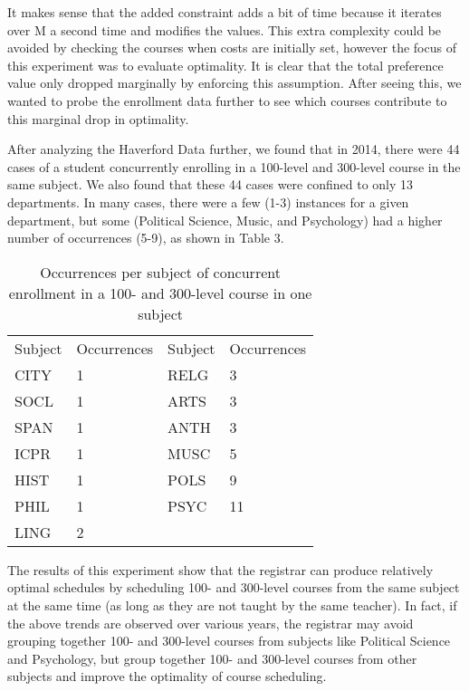 \documentclass[11pt, oneside]{article}   	%
\begin{document}
\begin{enumerate}
It makes sense that the added constraint adds a bit of time because it iterates over M a second time and modifies the values. This extra complexity could be avoided by checking the courses when costs are initially set, however the focus of this experiment was to evaluate optimality. It is clear that the total preference value only dropped marginally by enforcing this assumption. After seeing this, we wanted to probe the enrollment data further to see which courses contribute to this marginal drop in optimality.

After analyzing the Haverford Data further, we found that in 2014, there were 44 cases of a student concurrently enrolling in a 100-level and 300-level course in the same subject. We also found that these 44 cases were confined to only 13 departments. In many cases, there were a few (1-3) instances for a given department, but some (Political Science, Music, and Psychology) had a higher number of occurrences (5-9), as shown in Table 3.\\

\begin{table}[h]
\centering
\begin{tabular}{llll}
Subject & Occurrences & Subject & Occurrences \\
CITY    & 1           & RELG    & 3           \\
SOCL    & 1           & ARTS    & 3           \\
SPAN    & 1           & ANTH    & 3           \\
ICPR    & 1           & MUSC    & 5           \\
HIST    & 1           & POLS    & 9           \\
PHIL    & 1           & PSYC    & 11          \\
LING    & 2           &         &             \\        
\end{tabular}
\caption{Occurrences per subject of concurrent enrollment in a 100- and 300-level course in one subject}
\label{my-label}
\end{table}

The results of this experiment show that the registrar can produce relatively optimal schedules by scheduling 100- and 300-level courses from the same subject at the same time (as long as they are not taught by the same teacher). In fact, if the above trends are observed over various years, the registrar may avoid grouping together 100- and 300-level courses from subjects like Political Science and Psychology, but group together 100- and 300-level courses from other subjects and improve the optimality of course scheduling.\\


\end{enumerate}
\end{document}
